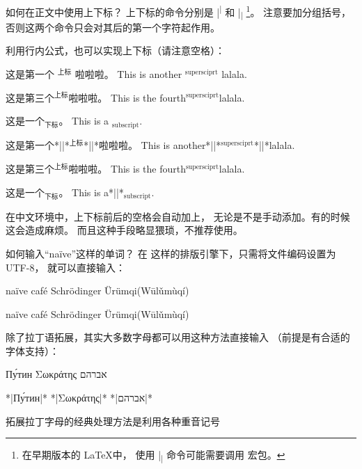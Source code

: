 \begin{myQA}{如何在正文中使用上下标？}
上下标的命令分别是 \code|\textsuperscript|
和 \code|\textsubscript|
\footnote{在早期版本的 \LaTeX 中，
	使用 \code|\textsubscript| 命令可能需要调用
	  宏包。}。
注意要加分组括号，否则这两个命令只会对其后的第一个字符起作用。

利用行内公式，也可以实现上下标（请注意空格）：
\begin{myExampleV}
{\vspace{1 ex}

这是第一个 $^\text{上标}$ 啦啦啦。
This is another $^\text{supersciprt}$ lalala.

这是第三个$^\text{上标}$啦啦啦。
This is the fourth$^\text{supersciprt}$lalala.

这是一个$_\text{下标}$。
This is a $_\text{subscript}$.}
这是第一个*|\vispace|*$^\text{上标}$*|\vispace|*啦啦啦。
This is another*|\vispace|*$^\text{supersciprt}$*|\vispace|*lalala.

这是第三个$^\text{上标}$啦啦啦。
This is the fourth$^\text{supersciprt}$lalala.

这是一个$_\text{下标}$。
This is a*|\vispace|*$_\text{subscript}$.
\end{myExampleV}
在中文环境中，上下标前后的空格会自动加上，
无论是不是手动添加。有的时候这会造成麻烦。
而且这种手段略显猥琐，不推荐使用。

\end{myQA}

\begin{myQA}{如何输入“naïve”这样的单词？}
在  这样的排版引擎下，只需将文件编码设置为 UTF-8，
就可以直接输入：
\begin{myExampleV}
{\vspace{1 ex}

naïve \quad café \quad Schrödinger \quad Ürümqi(Wūlǔmùqí)}
naïve \quad café \quad Schrödinger \quad Ürümqi(Wūlǔmùqí)
\end{myExampleV}

除了拉丁语拓展，其实大多数字母都可以用这种方法直接输入
（前提是有合适的字体支持）：
\begin{myExampleV}
{\vspace{1 ex}

{\LinLibertine Пу́тин \quad	 Σωκράτης \quad אברהם}}
\setmainfont{Linux Libertine O}
*|{\CourierNew Пу́тин}|*     \quad  %
*|{\CourierNew Σωκράτης}|*  \quad  %
*|{\CourierNew אברהם}|*            %
\end{myExampleV}

拓展拉丁字母的经典处理方法是利用各种重音记号
\end{myQA}